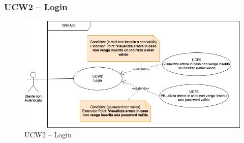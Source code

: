 \subsubsection{UCW2 – Login}
\begin{figure}[!h]
\centering
\includegraphics[scale=0.5]{UC_images/UCW2.png}
\caption{UCW2 – Login}
\end{figure}
